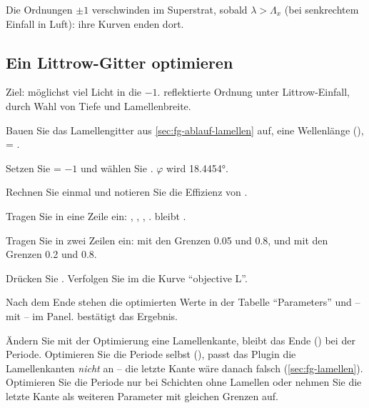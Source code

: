 Die Ordnungen $\pm 1$ verschwinden im Superstrat, sobald $\lambda > \Lambda_x$ (bei senkrechtem
Einfall in Luft): ihre Kurven enden dort.

\subsection{Ein Littrow-Gitter optimieren}\label{sec:fg-ablauf-optimieren}

Ziel: möglichst viel Licht in die $-1$. reflektierte Ordnung unter Littrow-Einfall, durch Wahl von
Tiefe und Lamellenbreite.

\begin{schritte}
  \item Bauen Sie das Lamellengitter aus \autoref{sec:fg-ablauf-lamellen} auf, eine Wellenlänge
    (), \gui{$\delta$} = .
  \item Setzen Sie  = $-1$ und wählen Sie . $\varphi$
    wird \ang{18.4454}.
  \item Rechnen Sie einmal  und notieren Sie die Effizienz von .
  \item Tragen Sie in  eine Zeile ein:
     ,  ,  ,  . 
    bleibt .
  \item Tragen Sie in  zwei Zeilen ein:
     mit den Grenzen 0.05 und 0.8, und
     mit den Grenzen 0.2 und 0.8.
  \item Drücken Sie . Verfolgen Sie im  die Kurve \enquote{objective L}.
  \item Nach dem Ende stehen die optimierten Werte in der Tabelle \enquote{Parameters} und -- mit
     -- im Panel.  bestätigt das Ergebnis.
\end{schritte}

\begin{hinweis}
Ändern Sie mit der Optimierung eine Lamellenkante, bleibt das Ende () bei der Periode.
Optimieren Sie die Periode selbst (), passt das Plugin die Lamellenkanten
\emph{nicht} an -- die letzte Kante wäre danach falsch (\autoref{sec:fg-lamellen}). Optimieren Sie
die Periode nur bei Schichten ohne Lamellen oder nehmen Sie die letzte Kante als weiteren Parameter
mit gleichen Grenzen auf.
\end{hinweis}

